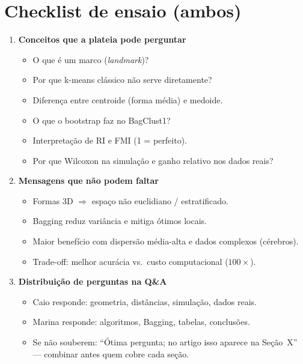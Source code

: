 \documentclass[12pt,a4paper]{article}
\begin{document}
\section{Checklist de ensaio (ambos)}

\begin{enumerate}[leftmargin=*]
  \item \textbf{Conceitos que a plateia pode perguntar}
  \begin{itemize}
    \item O que é um marco (\textit{landmark})?
    \item Por que k-means clássico não serve diretamente?
    \item Diferença entre centroide (forma média) e medoide.
    \item O que o bootstrap faz no BagClust1?
    \item Interpretação de RI e FMI (1 = perfeito).
    \item Por que Wilcoxon na simulação e ganho relativo nos dados reais?
  \end{itemize}

  \item \textbf{Mensagens que não podem faltar}
  \begin{itemize}
    \item Formas 3D $\Rightarrow$ espaço não euclidiano / estratificado.
    \item Bagging reduz variância e mitiga ótimos locais.
    \item Maior benefício com dispersão média-alta e dados complexos (cérebros).
    \item Trade-off: melhor acurácia vs.\ custo computacional ($100\times$).
  \end{itemize}

  \item \textbf{Distribuição de perguntas na Q\&A}
  \begin{itemize}
    \item Caio responde: geometria, distâncias, simulação, dados reais.
    \item Marina responde: algoritmos, Bagging, tabelas, conclusões.
    \item Se não souberem: ``Ótima pergunta; no artigo isso aparece na Seção~X'' --- combinar antes quem cobre cada seção.
  \end{itemize}
\end{enumerate}
\end{document}
